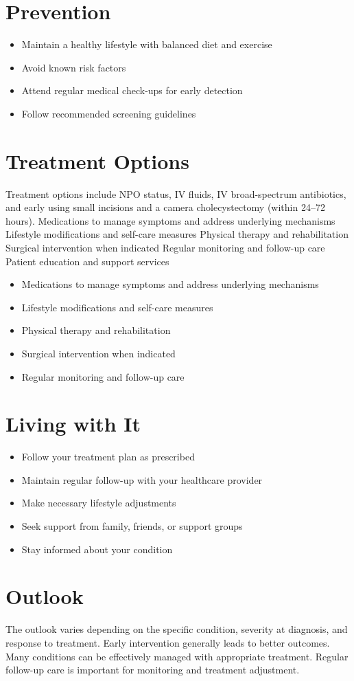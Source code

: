\section{Prevention}
\begin{itemize}[noitemsep]
  \item Maintain a healthy lifestyle with balanced diet and exercise
  \item Avoid known risk factors
  \item Attend regular medical check-ups for early detection
  \item Follow recommended screening guidelines
\end{itemize}
\section{Treatment Options}
Treatment options include NPO status, IV fluids, IV broad-spectrum antibiotics, and early using small incisions and a camera cholecystectomy (within 24--72 hours). Medications to manage symptoms and address underlying mechanisms Lifestyle modifications and self-care measures Physical therapy and rehabilitation Surgical intervention when indicated Regular monitoring and follow-up care Patient education and support services

\begin{itemize}[noitemsep]
  \item Medications to manage symptoms and address underlying mechanisms
  \item Lifestyle modifications and self-care measures
  \item Physical therapy and rehabilitation
  \item Surgical intervention when indicated
  \item Regular monitoring and follow-up care
\end{itemize}
\section{Living with It}
\begin{itemize}[noitemsep]
  \item Follow your treatment plan as prescribed
  \item Maintain regular follow-up with your healthcare provider
  \item Make necessary lifestyle adjustments
  \item Seek support from family, friends, or support groups
  \item Stay informed about your condition
\end{itemize}
\section{Outlook}
The outlook varies depending on the specific condition, severity at diagnosis, and response to treatment. Early intervention generally leads to better outcomes. Many conditions can be effectively managed with appropriate treatment. Regular follow-up care is important for monitoring and treatment adjustment.
